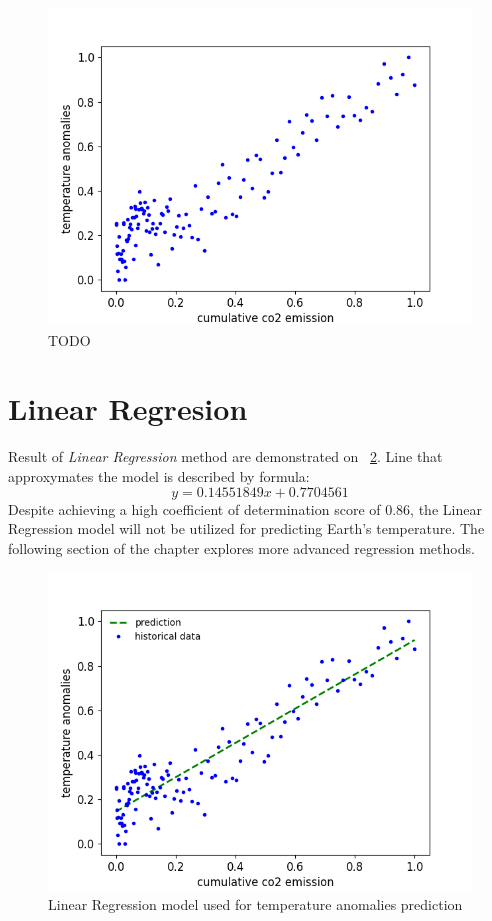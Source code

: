 \begin{figure}[h]
  \includegraphics[width=\linewidth]{img/cumulative-co2-temperature.png}
  \caption{TODO}
  \label{fig:cumulative-co2-temperature}
\end{figure}

\newpage
\section{Linear Regresion}
Result of \textit{Linear Regression} method are demonstrated on ~\ref{fig:linear-regression}. Line that approxymates the model is described by formula:
\[ y = 0.14551849x + 0.7704561  \]
Despite achieving a high coefficient of determination score of 0.86, the Linear Regression model will not be utilized for predicting Earth's temperature.
The following section of the chapter explores more advanced regression methods.
\begin{figure}[h]
  \includegraphics[width=\linewidth]{img/linear-regression.png}
  \caption{Linear Regression model used for temperature anomalies prediction }
  \label{fig:linear-regression}
\end{figure}

